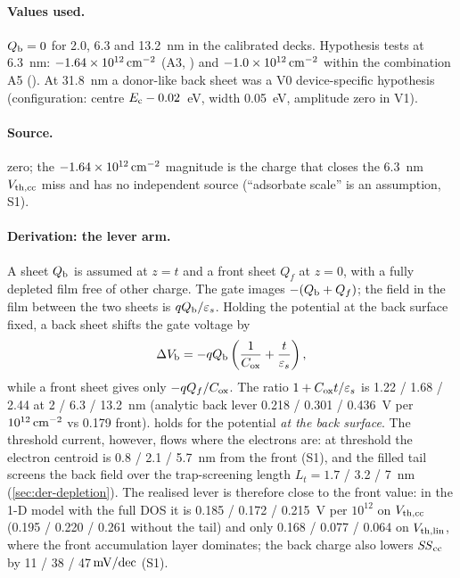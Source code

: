 \paragraph{Values used.}
$Q_{\mathrm{b}} = 0$ for 2.0, 6.3 and 13.2~nm in the calibrated decks. Hypothesis tests at 6.3~nm: $-1.64\times10^{12}\,\mathrm{cm}^{-2}$
(A3, ) and $-1.0\times10^{12}\,\mathrm{cm}^{-2}$ within the combination A5 (). At 31.8~nm a donor-like back
sheet was a V0 device-specific hypothesis (configuration: centre $E_{\mathrm{c}}-0.02$~eV, width 0.05~eV, amplitude zero in V1).

\paragraph{Source.}
 zero; the $-1.64\times10^{12}\,\mathrm{cm}^{-2}$ magnitude is the charge that closes the 6.3~nm $V_{\mathrm{th,cc}}$ miss and
has no independent source (``adsorbate scale'' is an assumption, S1).

\paragraph{Derivation: the lever arm.}
A sheet $Q_{\mathrm{b}}$ is assumed at $z = t$ and a front sheet $Q_f$ at $z = 0$, with a fully depleted film free of other charge.
The gate images $-(Q_{\mathrm{b}}+Q_f)$; the field in the film between the two sheets is $qQ_{\mathrm{b}}/\varepsilon_s$. Holding the
potential at the back surface fixed, a back sheet shifts the gate voltage by
\begin{equation}
  \Delta V_{\mathrm{b}} = -qQ_{\mathrm{b}}\left(\frac{1}{C_{\mathrm{ox}}} + \frac{t}{\varepsilon_s}\right),
  \label{eq:backq-lever}
\end{equation}
while a front sheet gives only $-q Q_f/C_{\mathrm{ox}}$. The ratio $1 + C_{\mathrm{ox}} t/\varepsilon_s$ is 1.22 / 1.68 / 2.44 at
2 / 6.3 / 13.2~nm (analytic back lever 0.218 / 0.301 / 0.436~V per $10^{12}\,\mathrm{cm}^{-2}$ vs 0.179 front). 
holds for the potential \emph{at the back surface}. The threshold current, however, flows where the electrons are:
at threshold the electron centroid is 0.8 / 2.1 / 5.7~nm from the front (S1), and the filled tail screens the back
field over the trap-screening length $L_t = 1.7$ / 3.2 / 7~nm (\cref{sec:der-depletion}). The realised lever is
therefore close to the front value: in the 1-D model with the full DOS it is 0.185 / 0.172 / 0.215~V per $10^{12}$ on
$V_{\mathrm{th,cc}}$ (0.195 / 0.220 / 0.261 without the tail) and only 0.168 / 0.077 / 0.064 on $V_{\mathrm{th,lin}}$, where the front
accumulation layer dominates; the back charge also lowers $\mathit{SS}_{\mathrm{cc}}$ by 11 / 38 / 47$\,\mathrm{mV/dec}$ (S1).

